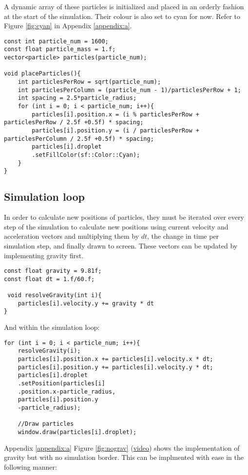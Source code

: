 \documentclass[write-up.tex]{subfiles}
\begin{document}
A dynamic array of these particles is initialized and placed in an orderly fashion at the start of the simulation. Their colour is also set to cyan for now. Refer to Figure \ref{fig:cyan} in Appendix \ref{appendix:a}.

\begin{lstlisting}
const int particle_num = 1600;
const float particle_mass = 1.f;
vector<particle> particles(particle_num);

void placeParticles(){
    int particlesPerRow = sqrt(particle_num);
    int particlesPerColumn = (particle_num - 1)/particlesPerRow + 1;
    int spacing = 2.5*particle_radius;
    for (int i = 0; i < particle_num; i++){
        particles[i].position.x = (i % particlesPerRow + particlesPerRow / 2.5f +0.5f) * spacing;
        particles[i].position.y = (i / particlesPerRow + particlesPerColumn / 2.5f +0.5f) * spacing;
        particles[i].droplet
        .setFillColor(sf::Color::Cyan);
    }
}

\end{lstlisting}

\subsection{Simulation loop}
In order to calculate new positions of particles, they must be iterated over every step of the simulation to calculate new positions using current velocity and acceleration vectors and multiplying them by $dt$, the change in time per simulation step, and finally drawn to screen. These vectors can be updated by implementing gravity first.
\begin{lstlisting}
const float gravity = 9.81f;
const float dt = 1.f/60.f;

 void resolveGravity(int i){
    particles[i].velocity.y += gravity * dt
}
\end{lstlisting}

And within the simulation loop:
\begin{lstlisting}
for (int i = 0; i < particle_num; i++){
    resolveGravity(i);
    particles[i].position.x += particles[i].velocity.x * dt;
    particles[i].position.y += particles[i].velocity.y * dt;
    particles[i].droplet
    .setPosition(particles[i]
    .position.x-particle_radius,
    particles[i].position.y
    -particle_radius);

    //Draw particles
    window.draw(particles[i].droplet);
\end{lstlisting}
Appendix \ref{appendix:a} Figure \ref{fig:nograv} (\href{https://youtube.com/shorts/FSuH_Cs1Qh4?feature=share}{video}) shows the implementation of gravity but with no simulation border. This can be implmented with ease in the following manner:
\end{document}
